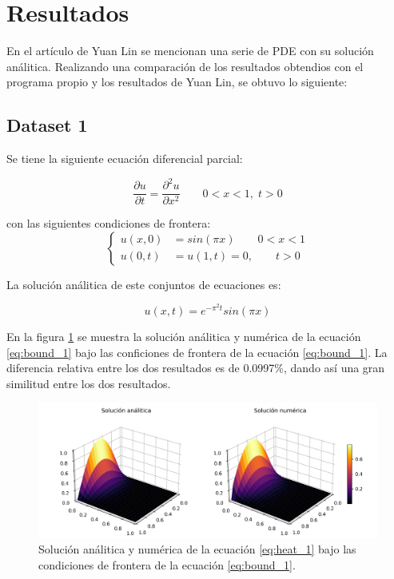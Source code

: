 \section{Resultados}

En el artículo de Yuan Lin\cite{yuan_2009} se mencionan una serie de PDE con su solución análitica. Realizando una comparación de los resultados obtendios con el programa propio y los resultados de Yuan Lin, se obtuvo lo siguiente:

\subsection{Dataset 1}

Se tiene la siguiente ecuación diferencial parcial:

\begin{equation}
    \frac{\partial u}{\partial t} = \frac{\partial^2 u}{\partial x^2} \qquad 0<x<1, \; t>0 \label{eq:heat_1}
\end{equation}

con las siguientes condiciones de frontera:
\begin{equation}
    \begin{cases}
        u(x,0) & = sin(\pi x) \qquad 0<x<1 \\
        u(0,t) & =u(1,t) = 0, \qquad t>0
    \end{cases} \label{eq:bound_1}
\end{equation}

La solución análitica de este conjuntos de ecuaciones es:

\begin{equation}
    u(x,t)= e^{-\pi^2 t}sin(\pi x) \label{eq:sol_1}
\end{equation}

En la figura \ref{fig:sol_1} se muestra la solución análitica y numérica de la ecuación \ref{eq:bound_1} bajo las conficiones de frontera de la ecuación \ref{eq:bound_1}. La diferencia relativa entre los dos resultados es de 0.0997\%, dando así una gran similitud entre los dos resultados.

\begin{figure}[H]
    \centering
    \includegraphics[width=16cm]{Graphics/surface_3.png}
    \caption{Solución análitica y numérica de la ecuación \ref{eq:heat_1} bajo las condiciones de frontera de la ecuación \ref{eq:bound_1}.}
    \label{fig:sol_1}
\end{figure}

